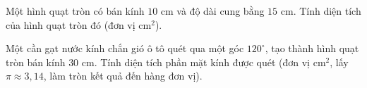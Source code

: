 \begin{bt}%
	Một hình quạt tròn có bán kính $10\text{ cm}$ và độ dài cung bằng $15\text{ cm}$. Tính diện tích của hình quạt tròn đó (đơn vị $\text{cm}^2$).
\end{bt}

\begin{bt}%
	Một cần gạt nước kính chắn gió ô tô quét qua một góc $120^\circ$, tạo thành hình quạt tròn bán kính $30\text{ cm}$. Tính diện tích phần mặt kính được quét (đơn vị $\text{cm}^2$, lấy $\pi \approx 3{,}14$, làm tròn kết quả đến hàng đơn vị).
\end{bt}

